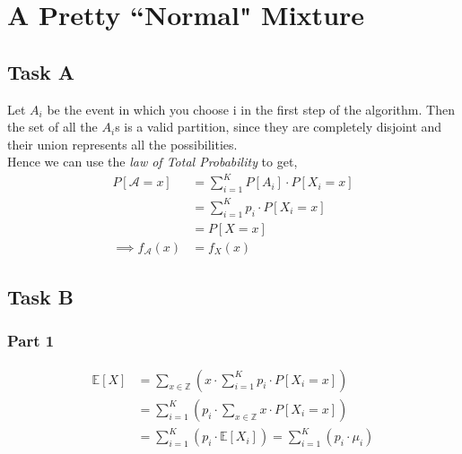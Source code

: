 \section{A Pretty “Normal" Mixture}
\subsection{Task A}
Let $A_i$ be the event in which you choose i in the first step of the algorithm. Then the set of all the $A_i$s is a valid partition, since they are completely disjoint and their union represents all the possibilities.\\
    Hence we can use the \textit{law of Total Probability} to get,\\
\begin{align*}
    P[\mathcal{A}=x] &= \sum_{i=1}^{K} P[A_i]\cdot P[X_i=x] \\
    &= \sum_{i=1}^{K} p_i\cdot P[X_i=x]\\
    &=P[X=x]\\
    \implies f_\mathcal{A}(x) &= f_X(x)
\end{align*}
\subsection{Task B}
\subsubsection{Part 1}
\begin{align*}
    \mathbb{E}[X]&=\sum_{x\in \mathbb{Z}} \left(x \cdot \sum_{i=1}^{K} p_i\cdot P[X_i=x] \right) \\
    &=\sum_{i=1}^{K} \left(p_i\cdot \sum_{x\in \mathbb{Z}} x \cdot P[X_i=x]\right)\\
    &=\sum_{i=1}^{K} \left(p_i\cdot \mathbb{E}[X_i]\right) =\sum_{i=1}^{K} \left(p_i\cdot \mu_i\right) 
\end{align*}
